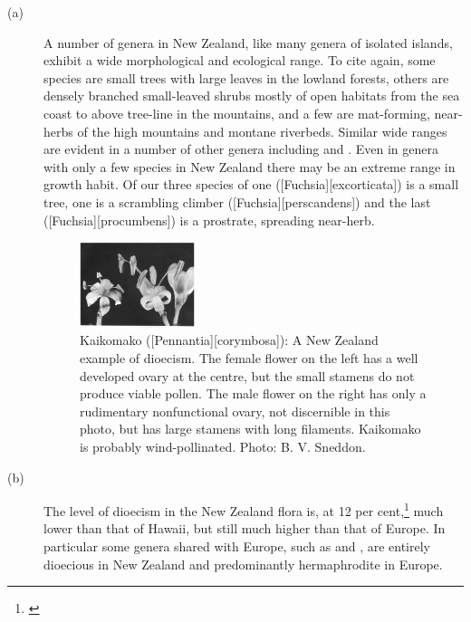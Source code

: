 \begin{description}
\item[{(a)}]A number of genera in New Zealand, like many genera of isolated islands, exhibit a wide morphological and ecological range.
To cite  again, some species are small trees with large leaves in the lowland forests, others are densely branched small-leaved shrubs mostly of open habitats from the sea coast to above tree-line in the mountains, and a few are mat-forming, near-herbs of the high mountains and montane riverbeds.
Similar wide ranges are evident in a number of other genera including  and .
Even in genera with only a few species in New Zealand there may be an extreme range in growth habit.
Of our three species of  one ([Fuchsia][excorticata]) is a small tree, one is a scrambling climber ([Fuchsia][perscandens]) and the last ([Fuchsia][procumbens]) is a prostrate, spreading near-herb.
\begin{figure}
	\includegraphics[width=0.33\textwidth]{graphics/figure4kaikomako.jpg}
	\centering
	\caption[Kaikomako: A New Zealand example of dioecism]{Kaikomako ([Pennantia][corymbosa]): A New Zealand example of dioecism.
	The female flower on the left has a well developed ovary at the centre, but the small stamens do not produce viable pollen.
	The male flower on the right has only a rudimentary nonfunctional ovary, not discernible in this photo, but has large stamens with long filaments.
	Kaikomako is probably wind-pollinated.
	Photo: B. V. Sneddon.}%
	\label{fig:4kaikomako}
\end{figure}
\item[{(b)}]The level of dioecism in the New Zealand flora is, at 12 per cent,\footnote{\cite{godley1979flower}} much lower than that of Hawai{\okina}i, but still much higher than that of Europe.
In particular some genera shared with Europe, such as  and , are entirely dioecious in New Zealand and predominantly hermaphrodite in Europe.

\end{description}
